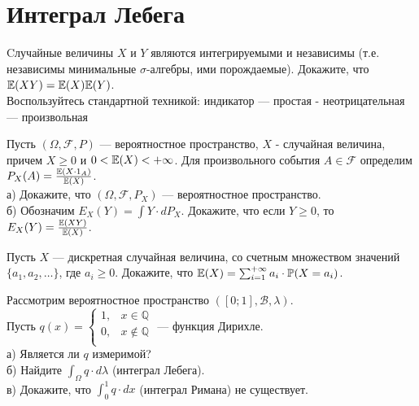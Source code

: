 \section{Интеграл Лебега}

\begin{problem}
Cлучайные величины $X$ и $Y$ являются интегрируемыми и независимы
(т.е. независимы минимальные $\sigma$-алгебры, ими
порождаемые). Докажите, что $\mathbb{E}(XY)=\mathbb{E}(X)\mathbb{E}(Y)$. \\
Воспользуйтесь стандартной техникой: индикатор — простая -
неотрицательная — произвольная

\begin{sol}

\end{sol}
\end{problem}

\begin{problem}
Пусть $(\Omega,\mathcal{F},P)$ — вероятностное пространство, $X$ -
случайная величина, причем $X\ge 0$ и $0<\mathbb{E}(X)< + \infty$. Для
произвольного события $A\in\mathcal{F}$ определим
$P_{X}(A)=\frac{\mathbb{E}(X\cdot 1_{A})}{\mathbb{E}(X)}$. \\
а) Докажите, что $(\Omega,\mathcal{F},P_{X})$ — вероятностное пространство. \\
б) Обозначим $E_{X}(Y)=\int Y \cdot dP_{X}$. Докажите, что
если $Y\ge 0$, то $E_{X}(Y)=\frac{\mathbb{E}(XY)}{\mathbb{E}(X)}$.

\begin{sol}

\end{sol}
\end{problem}

\begin{problem}
Пусть $X$ — дискретная случайная величина, со счетным множеством
значений $\{a_{1},a_{2},\ldots\}$, где $a_{i} \ge 0$. Докажите, что
$\mathbb{E}(X)=\sum_{i=1}^{+\infty} a_{i}\cdot \mathbb{P}(X=a_{i})$.

\begin{sol}

\end{sol}
\end{problem}

\begin{problem}
Рассмотрим вероятностное пространство
$([0;1],\mathcal{B},\lambda)$. \\
Пусть $q(x)=
\begin{cases}
  1, & x\in \mathbb{Q} \\
  0, & x\notin \mathbb{Q} \\
\end{cases}$ — функция Дирихле. \\
а) Является ли $q$ измеримой? \\
б) Найдите $\int_{\Omega}q \cdot d\lambda$ (интеграл Лебега). \\
в) Докажите, что $\int_{0}^{1} q \cdot dx$ (интеграл Римана) не
существует.

\begin{sol}

\end{sol}
\end{problem}

